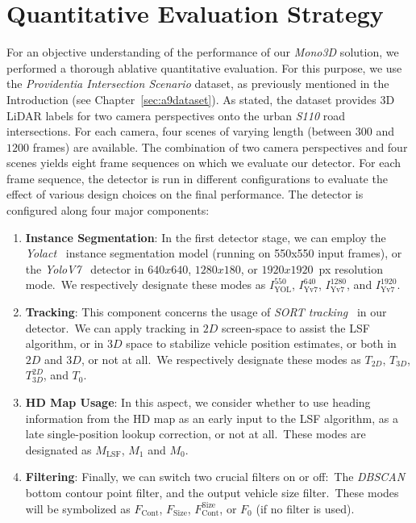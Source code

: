 
\section{Quantitative Evaluation Strategy}
\label{sec:quant}

For an objective understanding of the performance of our \textit{Mono3D} solution, we performed a thorough ablative quantitative evaluation.
For this purpose, we use the \textit{Providentia Intersection Scenario} dataset, as previously mentioned in the Introduction (see Chapter~\ref{sec:a9dataset}).
As stated, the dataset provides 3D LiDAR labels for two camera perspectives onto the urban \textit{S110} road intersections.
For each camera, four scenes of varying length (between $300$ and $1200$ frames) are available.
The combination of two camera perspectives and four scenes yields eight frame sequences on which we evaluate our detector.
For each frame sequence, the detector is run in different configurations to evaluate the effect of various design choices on the final performance.
The detector is configured along four major components:

\begin{enumerate}
    \item \textbf{Instance Segmentation}: In the first detector stage, we can employ the \textit{Yolact}~\cite{liu2021yolactedge} instance segmentation model (running on 550x550 input frames), or the \textit{YoloV7}~\cite{wang2022yolov7} detector in $640x640$, $1280x180$, or $1920x1920$~px resolution mode.\ We respectively designate these modes as $I^{550}_\text{YOL}$, $I^{640}_\text{Yv7}$, $I^{1280}_\text{Yv7}$, and $I^{1920}_\text{Yv7}$.
    \item \textbf{Tracking}: This component concerns the usage of \textit{SORT tracking}~\cite{bewley2016simple} in our detector.\ We can apply tracking in $2D$ screen-space to assist the LSF algorithm, or in $3D$ space to stabilize vehicle position estimates, or both in $2D$ and $3D$, or not at all.\ We respectively designate these modes as $T_{2D}$, $T_{3D}$, $T^{2D}_{3D}$, and $T_0$.
    \item \textbf{HD Map Usage}: In this aspect, we consider whether to use heading information from the HD map as an early input to the LSF algorithm, as a late single-position lookup correction, or not at all.\ These modes are designated as $M_\text{LSF}$, $M_1$ and $M_0$.
    \item \textbf{Filtering}: Finally, we can switch two crucial filters on or off:\ The \textit{DBSCAN}~\cite{schubert2017dbscan} bottom contour point filter, and the output vehicle size filter.\ These modes will be symbolized as $F_\text{Cont}$, $F_\text{Size}$, $F_\text{Cont}^\text{Size}$, or $F_0$ (if no filter is used).
\end{enumerate}

